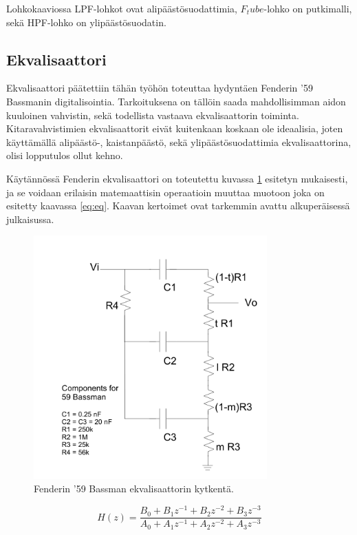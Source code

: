 \documentclass[11pt, a4paper, oneside]{article}
\begin{document}
Lohkokaaviossa LPF-lohkot ovat alipäästösuodattimia, $F_tube$-lohko on putkimalli, sekä HPF-lohko on ylipäästösuodatin. 
 
 \subsection{Ekvalisaattori}

Ekvalisaattori päätettiin tähän työhön toteuttaa hydyntäen Fenderin '59 Bassmanin digitalisointia. 
Tarkoituksena on tällöin saada mahdollisimman aidon kuuloinen vahvistin, sekä todellista vastaava ekvalisaattorin toiminta. 
Kitaravahvistimien ekvalisaattorit eivät kuitenkaan koskaan ole ideaalisia, joten käyttämällä alipäästö-, kaistanpäästö, sekä ylipäästösuodattimia ekvalisaattorina, olisi lopputulos ollut kehno. \cite{fender}

Käytännössä Fenderin ekvalisaattori on toteutettu kuvassa \ref{fig:eq} esitetyn mukaisesti, ja se voidaan erilaisin matemaattisin operaatioin muuttaa muotoon joka on esitetty kaavassa \ref{eq:eq}. 
Kaavan kertoimet ovat tarkemmin avattu alkuperäisessä julkaisussa. \cite{fender}

\begin{figure}[h!]
\includegraphics[width=0.8\textwidth, center]{eq.png} \newline
\caption{Fenderin '59 Bassman ekvalisaattorin kytkentä. \cite{fender}}
\label{fig:eq}
\end{figure}

\begin{equation}
H(z)=\frac{B_0 + B_1 z^{-1} + B_2 z^{-2} + B_3 z^{-3} }{A_0 + A_1 z^{-1}  + A_2 z^{-2}  + A_3 z^{-3} }
\label{eq:eq} %
\end{equation} 
\end{document}
